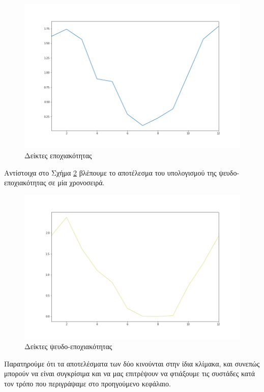 \begin{figure}[t!]
  \includegraphics[scale=0.5]{figures/seasonality.png}
\centering
\caption{Δείκτες εποχιακότητας}
\label{seasonality}
\end{figure} 

Αντίστοιχα στο Σχήμα \ref{pseudoseasonality} βλέπουμε το αποτέλεσμα του υπολογισμού της ψευδο-εποχιακότητας σε μία χρονοσειρά.


\begin{figure}[t!]
  \includegraphics[scale=0.5]{figures/pseudoseasonality.png}
\centering
\caption{Δείκτες ψευδο-εποχιακότητας}
\label{pseudoseasonality}
\end{figure} 

Παρατηρούμε ότι τα αποτελέσματα των δύο κινούνται στην ίδια κλίμακα, και συνεπώς μπορούν να είναι συγκρίσιμα και να μας επιτρέψουν να φτιάξουμε τις συστάδες κατά τον τρόπο που περιγράψαμε στο προηγούμενο κεφάλαιο. 


